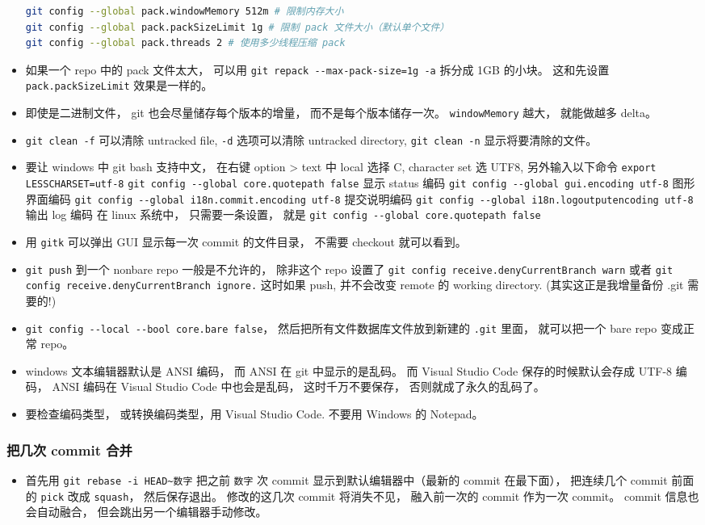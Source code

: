 \begin{itemize}
\begin{lstlisting}[language=bash]
git config --global pack.windowMemory 512m # 限制内存大小
git config --global pack.packSizeLimit 1g # 限制 pack 文件大小（默认单个文件）
git config --global pack.threads 2 # 使用多少线程压缩 pack
\end{lstlisting}
\item 如果一个 repo 中的 pack 文件太大， 可以用 \verb|git repack --max-pack-size=1g -a| 拆分成 1GB 的小块。 这和先设置 \verb|pack.packSizeLimit| 效果是一样的。
\item 即使是二进制文件， git 也会尽量储存每个版本的增量， 而不是每个版本储存一次。 \verb|windowMemory| 越大， 就能做越多 delta。
\item \verb|git clean -f| 可以清除 untracked file, \verb|-d| 选项可以清除 untracked directory,  \verb|git clean -n| 显示将要清除的文件。
\item 要让 windows 中 git bash 支持中文， 在右键 option > text 中 local 选择 C, character set 选 UTF8, 另外输入以下命令
\verb|export LESSCHARSET=utf-8|
\verb|git config --global core.quotepath false|     显示 status 编码
\verb|git config --global gui.encoding utf-8|    图形界面编码
\verb|git config --global i18n.commit.encoding utf-8|   提交说明编码
\verb|git config --global i18n.logoutputencoding utf-8| 输出 log 编码
在 linux 系统中， 只需要一条设置， 就是
\verb|git config --global core.quotepath false|
\item 用 \verb|gitk| 可以弹出 GUI 显示每一次 commit 的文件目录， 不需要 checkout 就可以看到。
\item \verb|git push| 到一个 nonbare repo 一般是不允许的， 除非这个 repo 设置了 \verb|git config receive.denyCurrentBranch warn| 或者 \verb|git config receive.denyCurrentBranch ignore.| 这时如果 push, 并不会改变 remote 的 working directory. (其实这正是我增量备份 .git 需要的!)
\item \verb|git config --local --bool core.bare false|， 然后把所有文件数据库文件放到新建的 \verb|.git| 里面， 就可以把一个 bare repo 变成正常 repo。
\item windows 文本编辑器默认是 ANSI 编码， 而 ANSI 在 git 中显示的是乱码。 而 Visual Studio Code 保存的时候默认会存成 UTF-8 编码， ANSI 编码在 Visual Studio Code 中也会是乱码， 这时千万不要保存， 否则就成了永久的乱码了。
\item 要检查编码类型， 或转换编码类型，用 Visual Studio Code.  不要用 Windows 的 Notepad。
\end{itemize}

\subsubsection{把几次 commit 合并}
\begin{itemize}
\item 首先用 \verb|git rebase -i HEAD~数字| 把之前 \verb|数字| 次 commit 显示到默认编辑器中（最新的 commit 在最下面）， 把连续几个 commit 前面的 \verb|pick| 改成 \verb|squash|， 然后保存退出。 修改的这几次 commit 将消失不见， 融入前一次的 commit 作为一次 commit。 commit 信息也会自动融合， 但会跳出另一个编辑器手动修改。
\end{itemize}


